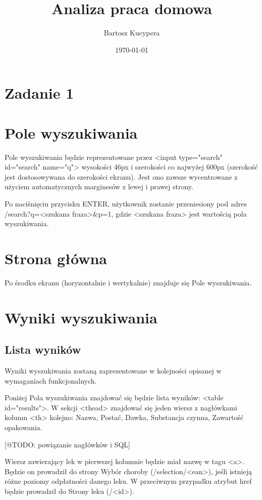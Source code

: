 \documentclass{article}
\title{Analiza praca domowa}
\author{Bartosz Kucypera}
\date{\today}
\begin{document}
\maketitle

\section*{Zadanie 1} 

\section{Pole wyszukiwania}

Pole wyszukiwania będzie reprezentowane przez <input type="search" id="search" name="q"> wysokości 46px i szerokości co najwyżej 600px (szerokość jest dostosowywana do szerokości ekranu). Jest ono zawsze wycentrowane z użyciem automatycznych marginesów z lewej i prawej strony.

Po naciśnięciu przycisku ENTER, użytkownik zostanie przeniesiony pod adres /search?q=<szukana fraza>\&p=1, gdzie <szukana fraza> jest wartością pola wyszukiwania.

\section{Strona główna}

Po środku ekranu (horyzontalnie i wertykalnie) znajduje się Pole wyszukiwania.

\section{Wyniki wyszukiwania}

\subsection{Lista wyników}

Wyniki wyszukiwania zostaną zaprezentowane w kolejności opisanej w wymaganiach funkcjonalnych.

Poniżej Pola wyszukiwania znajdować się będzie lista wyników: <table id="results">. W sekcji <thead> znajdować się jeden wiersz z nagłówkami kolumn <th> kolejno: Nazwa, Postać, Dawka, Substancja czynna, Zawartość opakowania.

[@TODO: powiązanie nagłówków i SQL]

Wiersz zawierający lek w pierwszej kolumnie będzie miał nazwę w tagu <a>. Będzie on prowadził do strony Wybór choroby (/selection/<ean>), jeśli istnieją różne poziomy odpłatności danego leku. W przeciwnym przypadku atrybut href będzie prowadził do Strony leku (/<id>).
\end{document}

